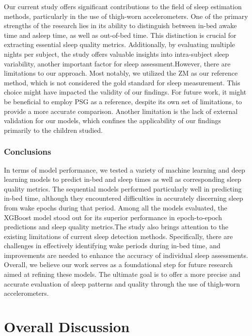 \documentclass[
  10pt,
]{scrbook}
\begin{document}
Our current study offers significant contributions to the field of sleep
estimation methods, particularly in the use of thigh-worn
accelerometers. One of the primary strengths of the research lies in its
ability to distinguish between in-bed awake time and asleep time, as
well as out-of-bed time. This distinction is crucial for extracting
essential sleep quality metrics. Additionally, by evaluating multiple
nights per subject, the study offers valuable insights into
intra-subject sleep variability, another important factor for sleep
assessment.However, there are limitations to our approach. Most notably,
we utilized the ZM as our reference method, which is not considered the
gold standard for sleep measurement. This choice might have impacted the
validity of our findings. For future work, it might be beneficial to
employ PSG as a reference, despite its own set of limitations, to
provide a more accurate comparison. Another limitation is the lack of
external validation for our models, which confines the applicability of
our findings primarily to the children studied.

\hypertarget{conclusions-2}{%
\subsection{Conclusions}\label{conclusions-2}}

In terms of model performance, we tested a variety of machine learning
and deep learning models to predict in-bed and sleep times as well as
corresponding sleep quality metrics. The sequential models performed
particularly well in predicting in-bed time, although they encountered
difficulties in accurately discerning sleep from wake epochs during that
period. Among all the models evaluated, the XGBoost model stood out for
its superior performance in epoch-to-epoch predictions and sleep quality
metrics.The study also brings attention to the existing limitations of
current sleep detection methods. Specifically, there are challenges in
effectively identifying wake periods during in-bed time, and
improvements are needed to enhance the accuracy of individual sleep
assessments. Overall, we believe our work serves as a foundational step
for future research aimed at refining these models. The ultimate goal is
to offer a more precise and accurate evaluation of sleep patterns and
quality through the use of thigh-worn accelerometers.

\hypertarget{overall-discussion}{%
\chapter{Overall Discussion}\label{overall-discussion}}
\end{document}
